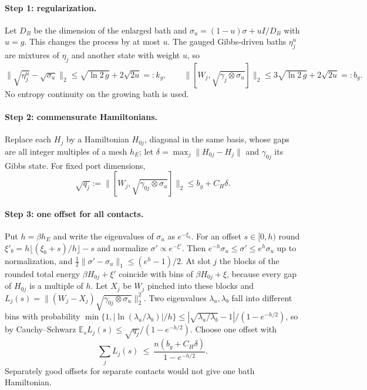 \paragraph{Step 1: regularization.} Let $D_B$ be the dimension of the enlarged bath and $\sigma_u=(1-u)\sigma+uI/D_B$ with $u=g$. This changes the process by at most $u$. The gauged Gibbs-driven baths $\eta_j^u$ are mixtures of $\eta_j$ and another state with weight $u$, so
\[
\|\sqrt{\eta_j^u}-\sqrt{\sigma_u}\|_2\le\sqrt{\ln2\,g}+2\sqrt{2u}=:k_g,\qquad \bigl\|[W_j,\sqrt{\gamma_j\otimes\sigma_u}]\bigr\|_2\le3\sqrt{\ln2\,g}+2\sqrt{2u}=:b_g.
\]
No entropy continuity on the growing bath is used.

\paragraph{Step 2: commensurate Hamiltonians.} Replace each $H_j$ by a Hamiltonian $H_{0j}$, diagonal in the same basis, whose gaps are all integer multiples of a mesh $h_E$; let $\delta=\max_j\|H_{0j}-H_j\|$ and $\gamma_{0j}$ its Gibbs state. For fixed port dimensions,
\[
\sqrt{q_j}:=\bigl\|[W_j,\sqrt{\gamma_{0j}\otimes\sigma_u}]\bigr\|_2\le b_g+C_H\delta.
\]

\paragraph{Step 3: one offset for all contacts.} Put $h=\beta h_E$ and write the eigenvalues of $\sigma_u$ as $e^{-\xi_b}$. For an offset $s\in[0,h)$ round $\xi'_b=h\lfloor(\xi_b+s)/h\rfloor-s$ and normalize $\sigma'\propto e^{-\xi'}$. Then $e^{-h}\sigma_u\le\sigma'\le e^h\sigma_u$ up to normalization, and $\frac12\|\sigma'-\sigma_u\|_1\le(e^h-1)/2$. At slot $j$ the blocks of the rounded total energy $\beta H_{0j}+\xi'$ coincide with bins of $\beta H_{0j}+\xi$, because every gap of $H_{0j}$ is a multiple of $h$. Let $X_j$ be $W_j$ pinched into these blocks and $L_j(s)=\|(W_j-X_j)\sqrt{\gamma_{0j}\otimes\sigma_u}\|_2^2$. Two eigenvalues $\lambda_a,\lambda_b$ fall into different bins with probability $\min\{1,|\ln(\lambda_a/\lambda_b)|/h\}\le|\sqrt{\lambda_a/\lambda_b}-1|/(1-e^{-h/2})$, so by Cauchy--Schwarz $\mathbb E_sL_j(s)\le\sqrt{q_j}/(1-e^{-h/2})$. Choose one offset with
\begin{equation}\label{ar:eq:offset}
\sum_jL_j(s)\ \le\ \frac{n(b_g+C_H\delta)}{1-e^{-h/2}}.
\end{equation}
Separately good offsets for separate contacts would not give one bath Hamiltonian.

